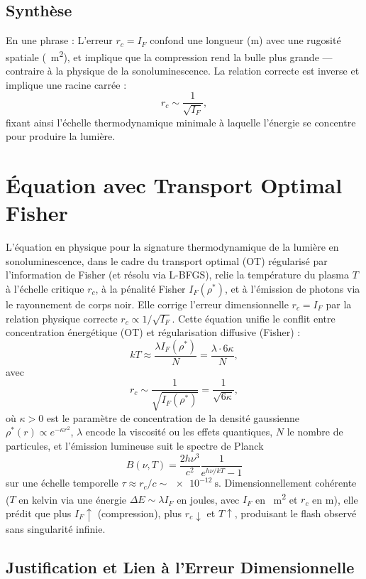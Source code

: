 \documentclass[a4paper,12pt]{article}
\begin{document}
\subsection{Synthèse}
En une phrase :  
L’erreur \( r_c = I_F \) confond une longueur (\si{\meter}) avec une rugosité spatiale (\si{\per\meter\squared}),
et implique que la compression rend la bulle plus grande — contraire à la physique de la sonoluminescence.  
La relation correcte est inverse et implique une racine carrée :  
\[
r_c \sim \frac{1}{\sqrt{I_F}},
\]
fixant ainsi l’échelle thermodynamique minimale à laquelle l’énergie se concentre pour produire la lumière.
\newpage
\section{Équation avec Transport Optimal Fisher}

L'équation en physique pour la signature thermodynamique de la lumière en sonoluminescence, dans le cadre du transport optimal (OT) régularisé par l'information de Fisher (et résolu via L-BFGS), relie la température du plasma \( T \) à l'échelle critique \( r_c \), à la pénalité Fisher \( I_F(\rho^*) \), et à l'émission de photons via le rayonnement de corps noir. Elle corrige l'erreur dimensionnelle \( r_c = I_F \) par la relation physique correcte \( r_c \propto 1/\sqrt{I_F} \). Cette équation unifie le conflit entre concentration énergétique (OT) et régularisation diffusive (Fisher) :
\[
k T \approx \frac{\lambda I_F(\rho^*)}{N} = \frac{\lambda \cdot 6 \kappa}{N},
\]
avec
\[
r_c \sim \frac{1}{\sqrt{I_F(\rho^*)}} = \frac{1}{\sqrt{6 \kappa}},
\]
où \( \kappa > 0 \) est le paramètre de concentration de la densité gaussienne \( \rho^*(r) \propto e^{-\kappa r^2} \), \( \lambda \) encode la viscosité ou les effets quantiques, \( N \) le nombre de particules, et l'émission lumineuse suit le spectre de Planck
\[
B(\nu, T) = \frac{2 h \nu^3}{c^2} \frac{1}{e^{h \nu / k T} - 1}
\]
sur une échelle temporelle \( \tau \approx r_c / c \sim \SI{e-12}{\second} \). Dimensionnellement cohérente (\( T \) en kelvin via une énergie \( \Delta E \sim \lambda I_F \) en joules, avec \( I_F \) en \si{\per\meter\squared} et \( r_c \) en \si{\meter}), elle prédit que plus \( I_F \uparrow \) (compression), plus \( r_c \downarrow \) et \( T \uparrow \), produisant le flash observé sans singularité infinie.

\subsection{Justification et Lien à l'Erreur Dimensionnelle}
\end{document}
